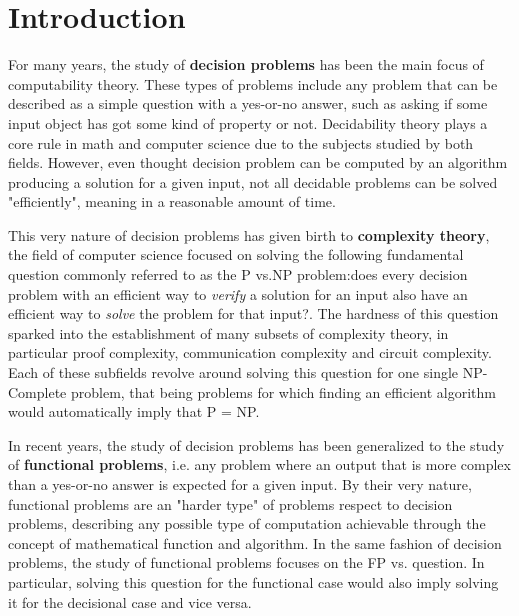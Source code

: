 \hypersetup{colorlinks=true, linkcolor=blue, citecolor=red}

\chapter{Introduction} \label{chap:introduction}

For many years, the study of \textbf{decision problems} has been the main focus of computability theory. These types of problems include any problem that can be described as a simple question with a yes-or-no answer, such as asking if some input object has got some kind of property or not. Decidability theory plays a core rule in math and computer science due to the subjects studied by both fields. However, even thought decision problem can be computed by an algorithm producing a solution for a given input, not all decidable problems can be solved "efficiently", meaning in a reasonable amount of time.

This very nature of decision problems has given birth to \textbf{complexity theory}, the field of computer science focused on solving the following fundamental question commonly referred to as the \textsf{P} vs.\@ \textsf{NP} problem:\@ \flqq does every decision problem with an efficient way to \textit{verify} a solution for an input also have an efficient way to \textit{solve} the problem for that input?\frqq. The hardness of this question sparked into the establishment of many subsets of complexity theory, in particular proof complexity, communication complexity and circuit complexity. Each of these subfields revolve around solving this question for one single \textsf{NP}-Complete problem, that being problems for which finding an efficient algorithm would automatically imply that \textsf{P} = \textsf{NP}.

In recent years, the study of decision problems has been generalized to the study of \textbf{functional problems}, i.e. any problem where an output that is more complex than a yes-or-no answer is expected for a given input. By their very nature, functional problems are an "harder type" of problems respect to decision problems, describing any possible type of computation achievable through the concept of mathematical function and algorithm. In the same fashion of decision problems, the study of functional problems focuses on the \textsf{FP} vs.\@ {} question. In particular, solving this question for the functional case would also imply solving it for the decisional case and vice versa.

